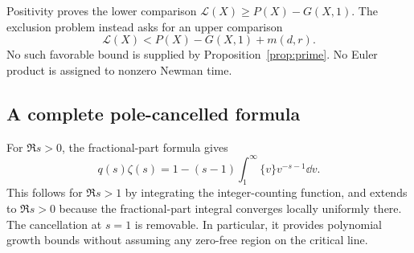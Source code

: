 Positivity proves the lower comparison
\(\mathcal L(X)\ge P(X)-G(X,1)\).
The exclusion problem instead asks for an upper comparison
\[
 \mathcal L(X)<P(X)-G(X,1)+m(d,r).
\]
No such favorable bound is supplied by Proposition~\ref{prop:prime}.
No Euler product is assigned to nonzero Newman time.


\subsection{A complete pole-cancelled formula}
For \(\Re s>0\), the fractional-part formula gives
\begin{equation}\label{eq:fractional}
 q(s)\zeta(s)=1-(s-1)\int_1^\infty\{v\}v^{-s-1}\dd v.
\end{equation}
This follows for $\Re s>1$ by integrating the integer-counting function, and extends to $\Re s>0$ because the fractional-part integral converges locally uniformly there. The cancellation at $s=1$ is removable. In particular, it provides polynomial growth bounds without assuming any zero-free region on the critical line.
